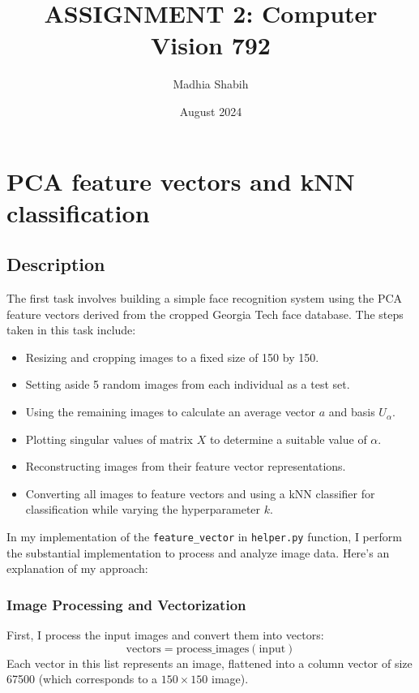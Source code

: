 \documentclass{article}
\title{ASSIGNMENT 2: Computer Vision 792}
\author{Madhia Shabih}
\date{August 2024}
\begin{document}
\maketitle

\section{PCA feature vectors and kNN classification}
\subsection{Description}  
   The first task involves building a simple face recognition system using the PCA feature vectors derived from the cropped Georgia Tech face database. 
   The steps taken in this task include:
   \begin{itemize}
       \item Resizing and cropping images to a fixed size of 150 by 150.
       \item Setting aside 5 random images from each individual as a test set.
       \item Using the remaining images to calculate an average vector \( a \) and basis \( U_\alpha \).
       \item Plotting singular values of matrix \( X \) to determine a suitable value of \( \alpha \).
       \item Reconstructing images from their feature vector representations.
       \item Converting all images to feature vectors and using a kNN classifier for classification while varying the hyperparameter \( k \).
   \end{itemize}

   In my implementation of the \texttt{feature\_vector} in \texttt{helper.py} function, I perform the substantial implementation to process and analyze image data. 
   Here's an explanation of my approach:

   \subsubsection{Image Processing and Vectorization}
   First, I process the input images and convert them into vectors:
   \begin{equation}
   \text{vectors} = \text{process\_images}(\text{input})
   \end{equation}
   Each vector in this list represents an image, flattened into a column vector of size 67500 (which corresponds to a $150 \times 150$ image).
   
\end{document}
